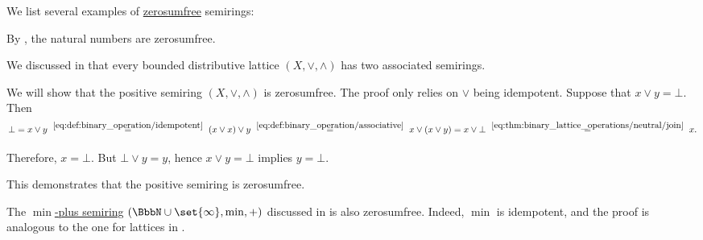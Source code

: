 \begin{example}\label{ex:def:zerosumfree}
  We list several examples of \hyperref[def:zerosumfree]{zerosumfree} semirings:
  \begin{thmenum}
     By , the natural numbers are zerosumfree.

     We discussed in  that every bounded distributive lattice \( (X, \vee, \wedge) \) has two associated semirings.

    We will show that the positive semiring \( (X, \vee, \wedge) \) is zerosumfree. The proof only relies on \( \vee \) being idempotent. Suppose that \( x \vee y = \bot \). Then
    \begin{equation*}
      \bot
      =
      x \vee y
      \reloset {\eqref{eq:def:binary_operation/idempotent}} =
      (x \vee x) \vee y
      \reloset {\eqref{eq:def:binary_operation/associative}} =
      x \vee (x \vee y)
      =
      x \vee \bot
      \reloset {\eqref{eq:thm:binary_lattice_operations/neutral/join}} =
      x.
    \end{equation*}

    Therefore, \( x = \bot \). But \( \bot \vee y = y \), hence \( x \vee y = \bot \) implies \( y = \bot \).

    This demonstrates that the positive semiring is zerosumfree.

     The \hyperref[def:tropical_semiring]{\( \min \)-plus semiring} \( (\BbbN \cup \set{ \infty }, \min, +) \) discussed in  is also zerosumfree. Indeed, \( \min \) is idempotent, and the proof is analogous to the one for lattices in .
  \end{thmenum}
\end{example}
